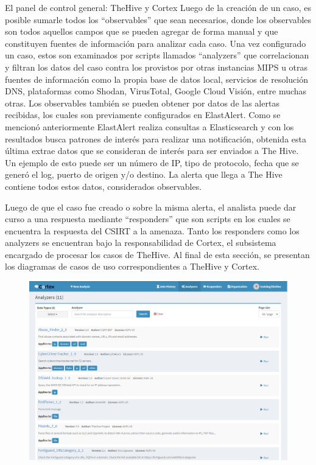 \begin{subsection}{El panel de control general: TheHive y Cortex}
     Luego de la creación de un caso, es posible sumarle todos los “observables” que sean necesarios, donde los observables son todos aquellos campos que se pueden agregar de forma manual y que constituyen fuentes de información para analizar cada caso. Una vez configurado un caso, estos son examinados por scripts llamados “analyzers” que correlacionan y filtran los datos del caso contra los provistos por otras instancias MIPS u otras fuentes de información como la propia base de datos local, servicios de resolución DNS, plataformas como Shodan\cite{shodan}, VirusTotal\cite{virustotal}, Google Cloud Visión\cite{vision-AI}, entre muchas otras. Los observables también se pueden obtener por datos de las alertas recibidas, los cuales son previamente configurados en ElastAlert. Como se mencionó anteriormente ElastAlert realiza consultas a Elasticsearch y con los resultados busca patrones de interés para realizar una notificación, obtenida esta última extrae datos que se consideran de interés para ser enviados a The Hive. Un ejemplo de esto puede ser un número de IP, tipo de protocolo, fecha que se generó el log, puerto de origen y/o destino. La alerta que llega a The Hive contiene todos estos datos, considerados observables. \par
     Luego de que el caso fue creado o sobre la misma alerta, el analista puede dar curso a una respuesta mediante “responders” que son scripts en los cuales se encuentra la respuesta del CSIRT a la amenaza. Tanto los responders como los analyzers se encuentran bajo la responsabilidad de Cortex, el subsistema encargado de procesar los casos de TheHive. Al final de esta sección, se presentan los diagramas de casos de uso correspondientes a TheHive y Cortex.
     \begin{figure}[H]
        \centering
        \includegraphics[width=1\textwidth]{./iteracion_1_imagenes/figura_26_analyzers_disponibles.png}

\end{figure}
\end{subsection}
